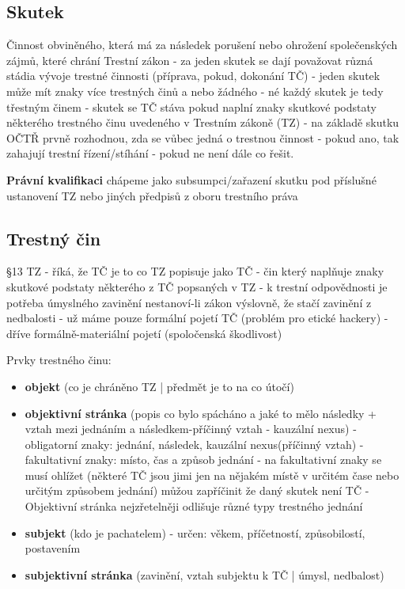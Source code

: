 \subsection{Skutek}
Činnost obviněného, která má za následek porušení nebo ohrožení společenských zájmů,
které chrání Trestní zákon - za jeden skutek se dají považovat různá stádia vývoje trestné činnosti
(příprava, pokud, dokonání TČ) - jeden skutek může mít znaky více trestných činů a nebo žádného
- né každý skutek je tedy třestným činem - skutek se TČ stáva pokud naplní znaky skutkové
podstaty některého trestného činu uvedeného v Trestním zákoně (TZ) - na základě skutku OČTŘ
prvně rozhodnou, zda se vůbec jedná o trestnou činnost - pokud ano, tak zahajují trestní
řízení/stíhání - pokud ne není dále co řešit.

\textbf{Právní kvalifikaci} chápeme jako subsumpci/zařazení skutku pod příslušné ustanovení TZ nebo
jiných předpisů z oboru trestního práva

\subsection{Trestný čin}
§13 TZ - říká, že TČ je to co TZ popisuje jako TČ - čin který naplňuje znaky
skutkové podstaty některého z TČ popsaných v TZ - k trestní odpovědnosti je potřeba úmyslného
zavinění nestanoví-li zákon výslovně, že stačí zavinění z nedbalosti - už máme pouze formální pojetí
TČ (problém pro etické hackery) - dříve formálně-materiální pojetí (spoločenská škodlivost)

Prvky trestného činu:
\begin{itemize}
    \item \textbf{objekt} (co je chráněno TZ | předmět je to na co útočí)
    \item \textbf{objektivní stránka} (popis co bylo spácháno a jaké to mělo následky + vztah mezi jednáním a
    následkem-příčinný vztah - kauzální nexus) - obligatorní znaky: jednání, následek, kauzální
    nexus(příčinný vztah) - fakultativní znaky: místo, čas a způsob jednání - na fakultativní
    znaky se musí ohlížet (některé TČ jsou jimi jen na nějakém místě v určitém čase nebo určitým
    způsobem jednání) můžou zapříčinit že daný skutek není TČ - Objektivní stránka nejzřetelněji
    odlišuje různé typy trestného jednání
    \item \textbf{subjekt} (kdo je pachatelem) - určen: věkem, příčetností, způsobilostí, postavením
    \item \textbf{subjektivní stránka} (zavinění, vztah subjektu k TČ | úmysl, nedbalost)
\end{itemize}

